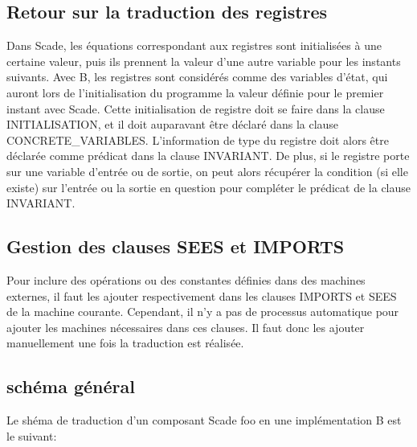\subsection{Retour sur la traduction des registres}
Dans Scade, les équations correspondant aux registres sont initialisées à une
certaine valeur, puis ils prennent la valeur d'une autre variable pour les
instants suivants. Avec B, les registres sont considérés comme des variables
d'état, qui auront lors de l'initialisation du programme la valeur définie pour
le premier instant avec Scade. 
Cette initialisation de registre doit se faire dans la clause INITIALISATION, et
il doit auparavant être déclaré dans la clause CONCRETE\_VARIABLES. L'information de
type du registre doit alors être déclarée comme prédicat dans la clause
INVARIANT. De plus, si le registre porte sur une variable d'entrée ou de sortie,
on peut alors récupérer la condition (si elle existe) sur l'entrée ou la sortie
en question pour compléter le prédicat de la clause INVARIANT. 


\subsection{Gestion des clauses SEES et IMPORTS}
Pour inclure des opérations ou des constantes définies dans des machines
externes, il faut les ajouter respectivement dans les clauses IMPORTS et SEES de
la machine courante. Cependant, il n'y a pas de processus automatique pour
ajouter les machines nécessaires dans ces clauses. Il faut donc les ajouter
manuellement une fois la traduction est réalisée.

\subsection{schéma général}

Le shéma de traduction d'un composant Scade foo en une implémentation B est
le suivant:
\newpage

